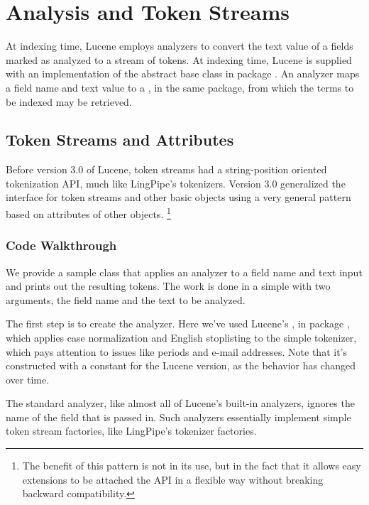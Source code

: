 \section{Analysis and Token Streams}\label{section:lucene-analysis}

At indexing time, Lucene employs analyzers to convert the text value
of a fields marked as analyzed to a stream of tokens.  At indexing
time, Lucene is supplied with an implementation of the abstract base
class  in package .
An analyzer maps a field name and text value to a ,
in the same package, from which the terms to be indexed may be
retrieved.

\subsection{Token Streams and Attributes}

Before version 3.0 of Lucene, token streams had a string-position
oriented tokenization API, much like LingPipe's tokenizers.  Version
3.0 generalized the interface for token streams and other basic
objects using a very general pattern based on attributes of other
objects.
%
\footnote{The benefit of this pattern is not in its use, but in the
  fact that it allows easy extensions to be attached the API in a
  flexible way without breaking backward compatibility.}

\subsubsection{Code Walkthrough}

We provide a sample class  that applies an
analyzer to a field name and text input and prints out the resulting
tokens.  The work is done in a simple  with two
arguments, the field name and the text to be analyzed.  

The first step is to create the analyzer.
%
%
Here we've used Lucene's , in package
, which applies case
normalization and English stoplisting to the simple tokenizer, which
pays attention to issues like periods and e-mail addresses.  Note that
it's constructed with a constant for the Lucene version, as the
behavior has changed over time.

The standard analyzer, like almost all of Lucene's built-in analyzers,
ignores the name of the field that is passed in.  Such analyzers
essentially implement simple token stream factories, like LingPipe's
tokenizer factories.

